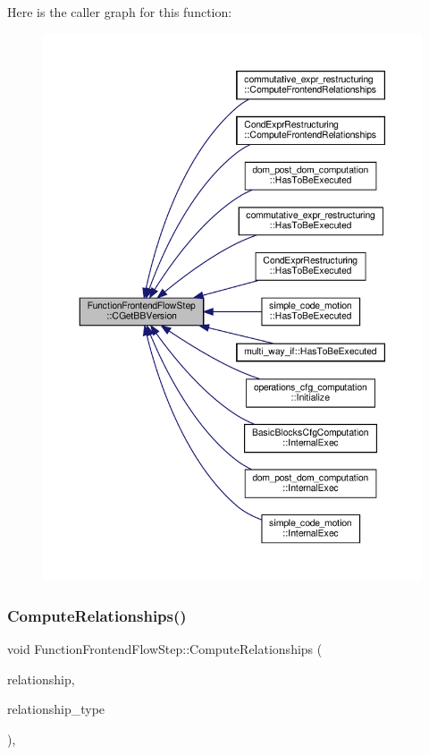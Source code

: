Here is the caller graph for this function\+:
\nopagebreak
\begin{figure}[H]
\begin{center}
\leavevmode
\includegraphics[width=350pt]{d8/d0a/classFunctionFrontendFlowStep_a3b2bc26e306ec1bb81f0c70b40632899_icgraph}
\end{center}
\end{figure}
\mbox{\label{classFunctionFrontendFlowStep_a1a815ea7885f3e92e414dadd40c43cba}} 
\subsubsection{\texorpdfstring{Compute\+Relationships()}{ComputeRelationships()}}
{\footnotesize\ttfamily void Function\+Frontend\+Flow\+Step\+::\+Compute\+Relationships (\begin{DoxyParamCaption}\item[{\hyperlink{classDesignFlowStepSet}{Design\+Flow\+Step\+Set} \&}]{relationship,  }\item[{const \hyperlink{classDesignFlowStep_a723a3baf19ff2ceb77bc13e099d0b1b7}{Design\+Flow\+Step\+::\+Relationship\+Type}}]{relationship\+\_\+type }\end{DoxyParamCaption})\hspace{0.3cm}{\ttfamily [override]}, {\ttfamily [virtual]}}



